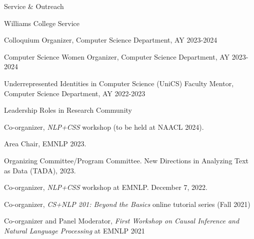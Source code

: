 \documentclass{resume} %
\begin{document}


\begin{rSection}{Service \& Outreach}

\begin{rSubsection}{Williams College Service}{}{}{}
\item Colloquium Organizer, Computer Science Department, AY 2023-2024
\item Computer Science Women Organizer, Computer Science Department, AY 2023-2024
\item Underrepresented Identities in Computer Science (UniCS) Faculty Mentor, Computer Science Department, AY 2022-2023
\end{rSubsection}

\begin{rSubsection}{Leadership Roles in Research Community}{}{}{}
\item Co-organizer, \emph{NLP+CSS} workshop (to be held at NAACL 2024). 
\item Area Chair, EMNLP 2023.
\item Organizing Committee/Program Committee. New Directions in Analyzing Text as Data (TADA), 2023.
\item Co-organizer, \emph{NLP+CSS} workshop at EMNLP. December 7, 2022. 
\item Co-organizer, \emph{CS+NLP 201: Beyond the Basics} online tutorial series (Fall 2021)
\item Co-organizer and Panel Moderator, \emph{First Workshop on Causal Inference and Natural Language Processing} at EMNLP 2021
\end{rSubsection}


\end{rSection}
\end{document}
